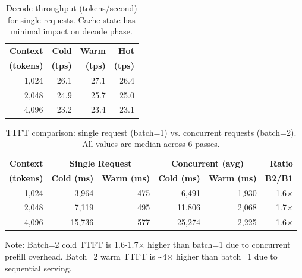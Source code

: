 
\begin{table}[t]
\centering
\caption{Decode throughput (tokens/second) for single requests.
Cache state has minimal impact on decode phase.}
\label{tab:decode-tps}
\begin{tabular}{rrrr}
\toprule
\textbf{Context} & \textbf{Cold} & \textbf{Warm} & \textbf{Hot} \\
\textbf{(tokens)} & \textbf{(tps)} & \textbf{(tps)} & \textbf{(tps)} \\
\midrule
1,024  & 26.1 & 27.1 & 26.4 \\
2,048  & 24.9 & 25.7 & 25.0 \\
4,096  & 23.2 & 23.4 & 23.1 \\
\bottomrule
\end{tabular}
\end{table}


\begin{table}[t]
\centering
\caption{TTFT comparison: single request (batch=1) vs. concurrent requests (batch=2).
All values are median across 6 passes.}
\label{tab:single-vs-concurrent}
\begin{tabular}{rrrrrr}
\toprule
\textbf{Context} & \multicolumn{2}{c}{\textbf{Single Request}} & \multicolumn{2}{c}{\textbf{Concurrent (avg)}} & \textbf{Ratio} \\
\textbf{(tokens)} & \textbf{Cold (ms)} & \textbf{Warm (ms)} & \textbf{Cold (ms)} & \textbf{Warm (ms)} & \textbf{B2/B1} \\
\midrule
1,024  & 3,964  & 475   & 6,491  & 1,930 & 1.6× \\
2,048  & 7,119  & 495   & 11,806 & 2,068 & 1.7× \\
4,096  & 15,736 & 577   & 25,274 & 2,225 & 1.6× \\
\bottomrule
\end{tabular}
\vspace{0.5em}
\small
Note: Batch=2 cold TTFT is 1.6-1.7× higher than batch=1 due to concurrent prefill overhead.
Batch=2 warm TTFT is \textasciitilde4× higher than batch=1 due to sequential serving.
\end{table}

